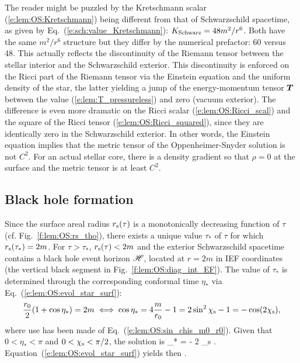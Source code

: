 \begin{remark}
The reader might be puzzled by the Kretschmann scalar (\ref{e:lem:OS:Kretschmann})
being different from that of Schwarzschild spacetime, as given by Eq.~(\ref{e:sch:value_Kretschmann}):
$K_{\rm Schwarz} = 48 m^2/r^6$. Both
have the same $m^2/r^6$ structure but they differ by the numerical prefactor: 60 versus 48.
This actually reflects the discontinuity of the Riemann tensor between the stellar interior
and the Schwarzschild exterior. This discontinuity is enforced on the Ricci part of the Riemann
tensor via the Einstein equation and the uniform density of the star, the latter yielding
a jump of the energy-momentum tensor $\bm{T}$ between the value (\ref{e:lem:T_pressureless})
and zero (vacuum exterior). The difference is even more dramatic on the Ricci scalar
(\ref{e:lem:OS:Ricci_scal})
and the square of the Ricci tensor (\ref{e:lem:OS:Ricci_squared}), since they are
identically zero in the Schwarzschild exterior. In other words, the Einstein equation
implies that the metric tensor of the Oppenheimer-Snyder solution is not $C^2$.
For an actual stellar core, there is a density gradient so that $\rho=0$
at the surface and the metric tensor is at least $C^2$.
\end{remark}


\subsection{Black hole formation}

Since the surface areal radius $r_{\rm s}(\tau)$ is a monotonically decreasing function
of $\tau$ (cf. Fig.~\ref{f:lem:OS:rs_tho}), there exists a unique value $\tau_*$ of
$\tau$ for which $r_{\rm s}(\tau_*) = 2 m$. For $\tau>\tau_*$, $r_{\rm s}(\tau) < 2 m$
and the exterior
Schwarzschild spacetime contains a black hole event horizon $\mathscr{H}$, located
at $r=2m$ in IEF coordinates (the vertical black segment in Fig.~\ref{f:lem:OS:diag_int_EF}).
The value of $\tau_*$ is determined through the corresponding
conformal time $\eta_*$ via Eq.~(\ref{e:lem:OS:evol_star_surf}):
\[
    \frac{r_0}{2} (1 + \cos\eta_*) = 2 m \iff
    \cos\eta_* = 4\frac{m}{r_0} - 1 = 2 \sin^2\chi_{\rm s} - 1 = - \cos(2\chi_{\rm s}) ,
\]
where use has been made of Eq.~(\ref{e:lem:OS:sin_chis_m0_r0}). Given that $0<\eta_*<\pi$
and $0<\chi_{\rm s} < \pi/2$, the solution is
\be \label{e:lem:OS:eta_star}
    \eta_* = \pi - 2 \chi_{\rm s} .
\ee
Equation~(\ref{e:lem:OS:evol_star_surf}) yields then
\be \label{e:lem:OS:tau_star}
   .
\ee

